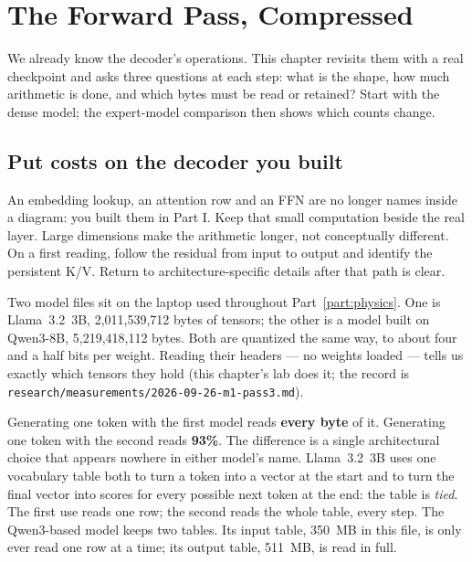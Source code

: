\chapter{The Forward Pass, Compressed}\label{ch:forward-pass}

\begin{ChapterIntent}
We already know the decoder's operations. This chapter revisits them with a real
checkpoint and asks three questions at each step: what is the shape, how much arithmetic
is done, and which bytes must be read or retained? Start with the dense model; the
expert-model comparison then shows which counts change.
\end{ChapterIntent}

\section*{Put costs on the decoder you built}
An embedding lookup, an attention row and an FFN are no longer names inside a diagram:
you built them in Part I. Keep that small computation beside the real layer. Large
dimensions make the arithmetic longer, not conceptually different. On a first reading,
follow the residual from input to output and identify the persistent K/V. Return to
architecture-specific details after that path is clear.


Two model files sit on the laptop used throughout Part~\ref{part:physics}.
One is Llama~3.2~3B, 2,011,539,712 bytes of tensors; the other is a model
built on Qwen3-8B, 5,219,418,112 bytes. Both are quantized the same way, to
about four and a half bits per weight. Reading their headers --- no weights
loaded --- tells us exactly which tensors they hold (this chapter's lab does
it; the record is \texttt{research/measurements/2026-09-26-m1-pass3.md}).

Generating one token with the first model reads \textbf{every byte} of it.
Generating one token with the second reads \textbf{93\%}. The difference is a
single architectural choice that appears nowhere in either model's name.
Llama~3.2~3B uses one vocabulary table both to turn a token into a vector at
the start and to turn the final vector into scores for every possible next
token at the end: the table is \emph{tied}. The first use reads one row; the
second reads the whole table, every step. The Qwen3-based model keeps two
tables. Its input table, 350~MB in this file, is only ever read one row at a
time; its output table, 511~MB, is read in full.

